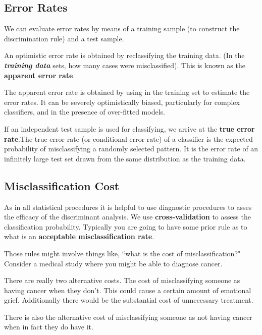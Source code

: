 \documentclass[]{report}
\begin{document}
\subsection{Error Rates}

We can evaluate error rates by means of a training sample (to construct the discrimination rule) and a test sample.


An optimistic error rate is obtained by reclassifying the training data. (In the \textbf{\textit{training data}} sets, how many cases were misclassified). This is known as the \textbf{apparent error rate}.


The apparent error rate is obtained by using in the training set to estimate
the error rates. It can be severely optimistically biased, particularly for complex classifiers, and in the presence of over-fitted models.


If an independent test sample is used for classifying, we arrive at the  \textbf{true error rate}.The true error rate (or conditional error rate) of a classifier is the expected
probability of misclassifying a randomly selected pattern.
It is the error rate of an infinitely large test set drawn from the same distribution as the training data.




\subsection{Misclassification Cost}

As in all statistical procedures it is helpful to use diagnostic procedures to asses the efficacy of the discriminant analysis. We use \textbf{cross-validation} to assess the classification probability.
Typically you are going to have some prior rule as to what is an \textbf{acceptable misclassification rate}.

Those rules might involve things like, ``what is the cost of misclassification?" Consider a medical study where you might be able to diagnose cancer.

There are really two alternative costs. The cost of misclassifying someone as having cancer when they don't.
This could cause a certain amount of emotional grief. Additionally there would be the substantial cost of unnecessary treatment.

There is also the alternative cost of misclassifying someone as not having cancer when in fact they do have it.
\end{document}
